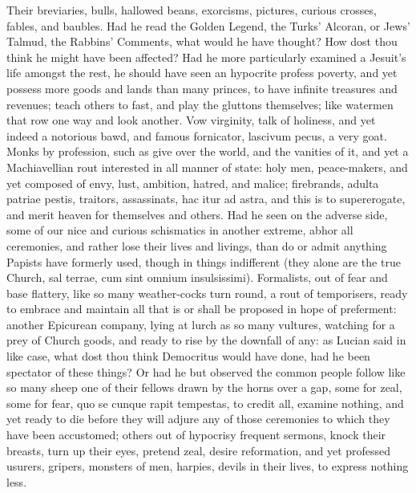{Their breviaries, bulls, hallowed beans, exorcisms, pictures, curious
crosses, fables, and baubles. Had he read the Golden Legend, the Turks'
Alcoran, or Jews' Talmud, the Rabbins' Comments, what would he have
thought? How dost thou think he might have been affected? Had he more
particularly examined a Jesuit's life amongst the rest, he should have
seen an hypocrite profess poverty, and yet possess more goods and
lands than many princes, to have infinite treasures and revenues; teach
others to fast, and play the gluttons themselves; like watermen that
row one way and look another. Vow virginity, talk of holiness, and
yet indeed a notorious bawd, and famous fornicator, lascivum pecus, a
very goat. Monks by profession, such as give over the world, and
the vanities of it, and yet a Machiavellian rout interested in all
manner of state: holy men, peace-makers, and yet composed of envy,
lust, ambition, hatred, and malice; firebrands, adulta patriae pestis,
traitors, assassinats, hac itur ad astra, and this is to supererogate,
and merit heaven for themselves and others. Had he seen on the adverse
side, some of our nice and curious schismatics in another extreme,
abhor all ceremonies, and rather lose their lives and livings, than do
or admit anything Papists have formerly used, though in things
indifferent (they alone are the true Church, sal terrae, cum sint
omnium insulsissimi). Formalists, out of fear and base flattery, like
so many weather-cocks turn round, a rout of temporisers, ready to
embrace and maintain all that is or shall be proposed in hope of
preferment: another Epicurean company, lying at lurch as so many
vultures, watching for a prey of Church goods, and ready to rise by the
downfall of any: as Lucian said in like case, what dost thou think
Democritus would have done, had he been spectator of these things?
Or had he but observed the common people follow like so many sheep one
of their fellows drawn by the horns over a gap, some for zeal, some for
fear, quo se cunque rapit tempestas, to credit all, examine nothing,
and yet ready to die before they will adjure any of those ceremonies to
which they have been accustomed; others out of hypocrisy frequent
sermons, knock their breasts, turn up their eyes, pretend zeal, desire
reformation, and yet professed usurers, gripers, monsters of men,
harpies, devils in their lives, to express nothing less.

}
